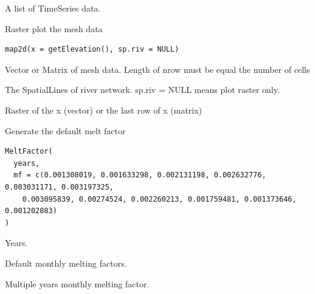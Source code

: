 \documentclass[a4paper]{book}
\begin{document}
%
\begin{Value}
A list of TimeSeries data.
\end{Value}
%
\begin{Description}\relax
Raster plot the mesh data
\end{Description}
%
\begin{Usage}
\begin{verbatim}
map2d(x = getElevation(), sp.riv = NULL)
\end{verbatim}
\end{Usage}
%
\begin{Arguments}
\begin{ldescription}
\item[\code{x}] Vector or Matrix of mesh data. Length of nrow must be equal the number of cells

\item[\code{sp.riv}] The SpatialLines of river network. sp.riv = NULL means plot raster only.
\end{ldescription}
\end{Arguments}
%
\begin{Value}
Raster of the x (vector) or the last row of x (matrix)
\end{Value}
%
\begin{Description}\relax
Generate the default melt factor
\end{Description}
%
\begin{Usage}
\begin{verbatim}
MeltFactor(
  years,
  mf = c(0.001308019, 0.001633298, 0.002131198, 0.002632776, 0.003031171, 0.003197325,
    0.003095839, 0.00274524, 0.002260213, 0.001759481, 0.001373646, 0.001202083)
)
\end{verbatim}
\end{Usage}
%
\begin{Arguments}
\begin{ldescription}
\item[\code{years}] Years.

\item[\code{mf}] Default monthly melting factors.
\end{ldescription}
\end{Arguments}
%
\begin{Value}
Multiple years monthly melting factor.
\end{Value}
\end{document}
